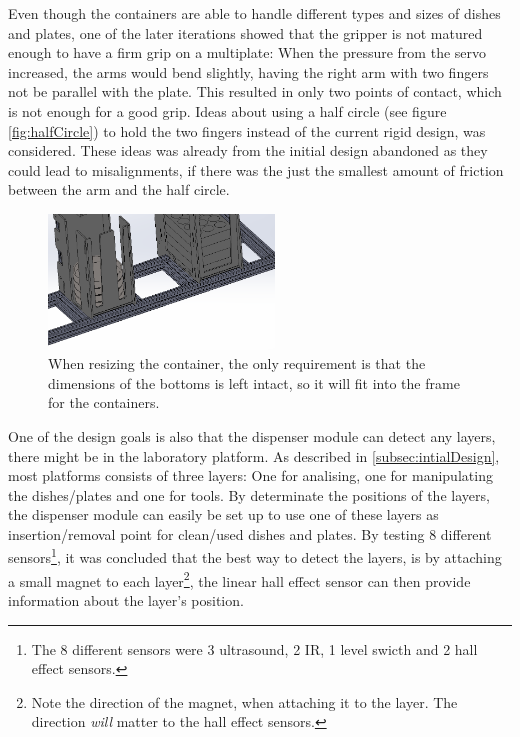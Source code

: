 \documentclass[10pt,a4paper]{article}
\begin{document}
		
		Even though the containers are able to handle different types and sizes of dishes and plates, one of the later iterations showed that the gripper is not matured enough to have a firm grip on a multiplate: When the pressure from the servo increased, the arms would bend slightly, having the right arm with two fingers not be parallel with the plate. This resulted in only two points of contact, which is not enough for a good grip. Ideas about using a half circle (see figure \ref{fig:halfCircle}) to hold the two fingers instead of the current rigid design, was considered. These ideas was already from the initial design abandoned as they could lead to misalignments, if there was the just the smallest amount of friction between the arm and the half circle.\\
		
		\begin{figure}
			\includegraphics[width=6cm]{images/containerFitFrame.png}
			\caption{When resizing the container, the only requirement is that the dimensions of the bottoms is left intact, so it will fit into the frame for the containers.}
			\label{fig::containerFitFrame}
		\end{figure}
		
		One of the design goals is also that the dispenser module can detect any layers, there might be in the laboratory platform. As described in \ref{subsec:intialDesign}, most platforms consists of three layers: One for analising, one for manipulating the dishes/plates and one for tools. By determinate the positions of the layers, the dispenser module can easily be set up to use one of these layers as insertion/removal point for clean/used dishes and plates. By testing 8 different sensors\footnote{The 8 different sensors were 3 ultrasound, 2 IR, 1 level swicth and 2 hall effect sensors.}, it was concluded that the best way to detect the layers, is by attaching a small magnet to each layer\footnote{Note the direction of the magnet, when attaching it to the layer. The direction \textit{will} matter to the hall effect sensors.}, the linear hall effect sensor can then provide information about the layer's position.
		
\end{document}
